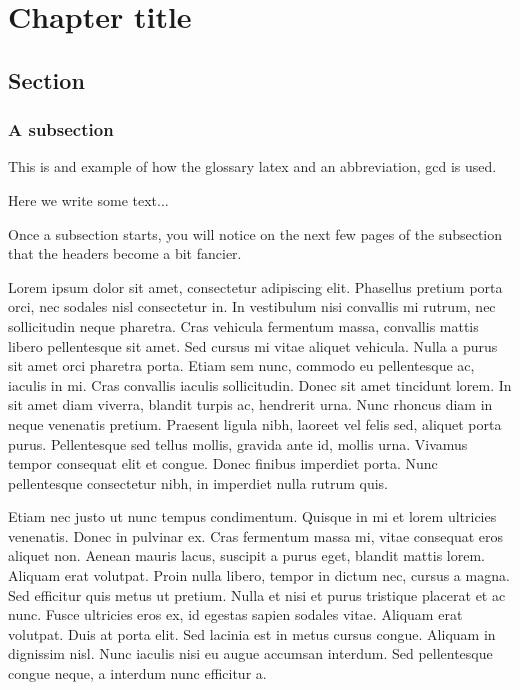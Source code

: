 \newpage

\chapter{Chapter title}
\section{Section}
\subsection{A subsection}

This is and example of how the glossary \Gls{latex} and an abbreviation, \gls{gcd} is used.

Here we write some text...

Once a subsection starts, you will notice on the next few pages of the subsection that the headers become a bit fancier.

Lorem ipsum dolor sit amet, consectetur adipiscing elit. Phasellus pretium porta orci, nec sodales nisl consectetur in. In vestibulum nisi convallis mi rutrum, nec sollicitudin neque pharetra. Cras vehicula fermentum massa, convallis mattis libero pellentesque sit amet. Sed cursus mi vitae aliquet vehicula. Nulla a purus sit amet orci pharetra porta. Etiam sem nunc, commodo eu pellentesque ac, iaculis in mi. Cras convallis iaculis sollicitudin. Donec sit amet tincidunt lorem. In sit amet diam viverra, blandit turpis ac, hendrerit urna. Nunc rhoncus diam in neque venenatis pretium. Praesent ligula nibh, laoreet vel felis sed, aliquet porta purus. Pellentesque sed tellus mollis, gravida ante id, mollis urna. Vivamus tempor consequat elit et congue. Donec finibus imperdiet porta. Nunc pellentesque consectetur nibh, in imperdiet nulla rutrum quis.

Etiam nec justo ut nunc tempus condimentum. Quisque in mi et lorem ultricies venenatis. Donec in pulvinar ex. Cras fermentum massa mi, vitae consequat eros aliquet non. Aenean mauris lacus, suscipit a purus eget, blandit mattis lorem. Aliquam erat volutpat. Proin nulla libero, tempor in dictum nec, cursus a magna. Sed efficitur quis metus ut pretium. Nulla et nisi et purus tristique placerat et ac nunc. Fusce ultricies eros ex, id egestas sapien sodales vitae. Aliquam erat volutpat. Duis at porta elit. Sed lacinia est in metus cursus congue. Aliquam in dignissim nisl. Nunc iaculis nisi eu augue accumsan interdum. Sed pellentesque congue neque, a interdum nunc efficitur a.

